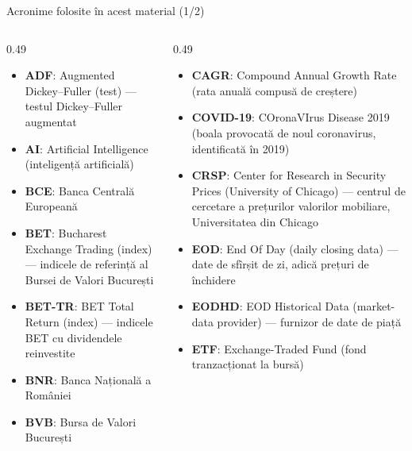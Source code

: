 \begin{frame}{Acronime folosite în acest material (1/2)}
\begin{columns}[T]
\begin{column}{0.49\textwidth}
\begin{itemize}\setlength{\itemsep}{0pt}
    \item \textbf{ADF}: Augmented Dickey–Fuller (test) — testul Dickey–Fuller augmentat
    \item \textbf{AI}: Artificial Intelligence (inteligență artificială)
    \item \textbf{BCE}: Banca Centrală Europeană
    \item \textbf{BET}: Bucharest Exchange Trading (index) — indicele de referință al Bursei de Valori București
    \item \textbf{BET-TR}: BET Total Return (index) — indicele BET cu dividendele reinvestite
    \item \textbf{BNR}: Banca Națională a României
    \item \textbf{BVB}: Bursa de Valori București
\end{itemize}
\end{column}
\begin{column}{0.49\textwidth}
\begin{itemize}\setlength{\itemsep}{0pt}
    \item \textbf{CAGR}: Compound Annual Growth Rate (rata anuală compusă de creștere)
    \item \textbf{COVID-19}: COronaVIrus Disease 2019 (boala provocată de noul coronavirus, identificată în 2019)
    \item \textbf{CRSP}: Center for Research in Security Prices (University of Chicago) — centrul de cercetare a prețurilor valorilor mobiliare, Universitatea din Chicago
    \item \textbf{EOD}: End Of Day (daily closing data) — date de sfîrșit de zi, adică prețuri de închidere
    \item \textbf{EODHD}: EOD Historical Data (market-data provider) — furnizor de date de piață
    \item \textbf{ETF}: Exchange-Traded Fund (fond tranzacționat la bursă)
\end{itemize}
\end{column}
\end{columns}
\end{frame}
